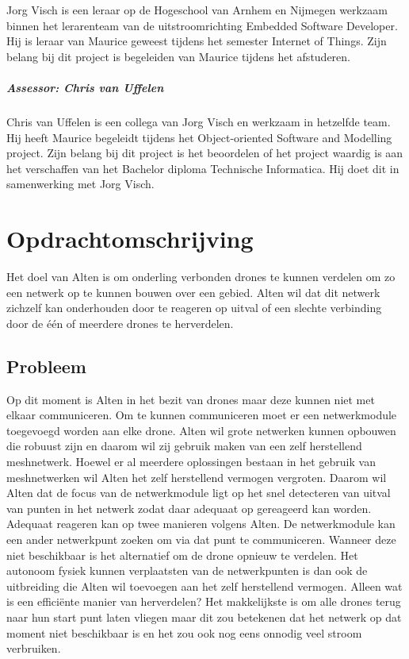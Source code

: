 \documentclass[a4paper, 11pt, oneside]{report}
\begin{document}
Jorg Visch is een leraar op de Hogeschool van Arnhem en Nijmegen werkzaam binnen het lerarenteam van de uitstroomrichting Embedded Software Developer. Hij is leraar van Maurice geweest tijdens het semester Internet of Things. Zijn belang bij dit project is begeleiden van Maurice tijdens het afstuderen.

\paragraph{Assessor: Chris van Uffelen}

Chris van Uffelen is een collega van Jorg Visch en werkzaam in hetzelfde team. Hij heeft Maurice begeleidt tijdens het Object-oriented Software and Modelling project. Zijn belang bij dit project is het beoordelen of het project waardig is aan het verschaffen van het Bachelor diploma Technische Informatica. Hij doet dit in samenwerking met Jorg Visch. 


\chapter{Opdrachtomschrijving}\label{sec:opdrachtomschrijving}
Het doel van Alten is om onderling verbonden drones te kunnen verdelen om zo een netwerk op te kunnen bouwen over een gebied. 
Alten wil dat dit netwerk zichzelf kan onderhouden door te reageren op uitval of een slechte verbinding door de één of meerdere drones te herverdelen.

\section{Probleem}\label{sec:probleem}
Op dit moment is Alten in het bezit van drones maar deze kunnen niet met elkaar communiceren.
Om te kunnen communiceren moet er een netwerkmodule toegevoegd worden aan elke drone.
Alten wil grote netwerken kunnen opbouwen die robuust zijn en daarom wil zij gebruik maken van een zelf herstellend meshnetwerk.
Hoewel er al meerdere oplossingen bestaan in het gebruik van meshnetwerken wil Alten het zelf herstellend vermogen vergroten. 
Daarom wil Alten dat de focus van de netwerkmodule ligt op het snel detecteren van uitval van punten in het netwerk zodat daar adequaat op gereageerd kan worden.
Adequaat reageren kan op twee manieren volgens Alten.
De netwerkmodule kan een ander netwerkpunt zoeken om via dat punt te communiceren.
Wanneer deze niet beschikbaar is het alternatief om de drone opnieuw te verdelen.
Het autonoom fysiek kunnen verplaatsten van de netwerkpunten is dan ook de uitbreiding die Alten wil toevoegen aan het zelf herstellend vermogen.
Alleen wat is een efficiënte manier van herverdelen?
Het makkelijkste is om alle drones terug naar hun start punt laten vliegen maar dit zou betekenen dat het netwerk op dat moment niet beschikbaar is en het zou ook nog eens onnodig veel stroom verbruiken.
\end{document}
